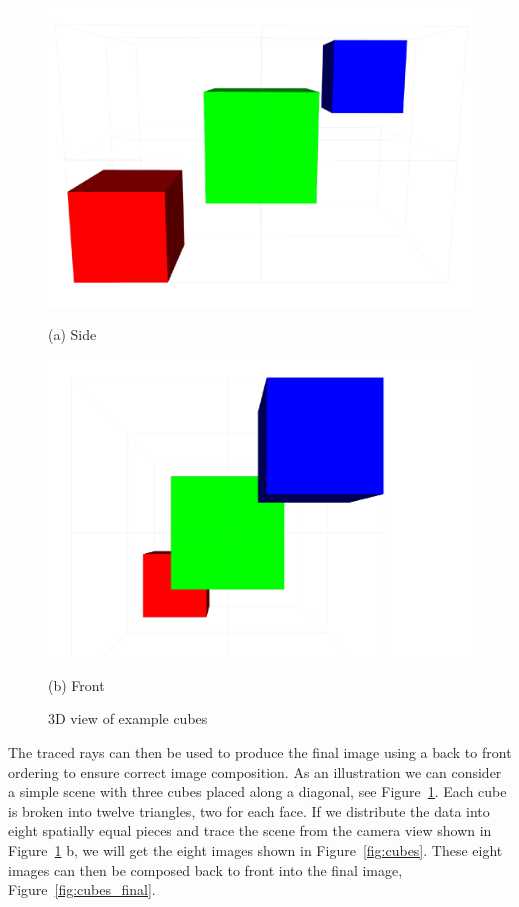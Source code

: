 \begin{figure}[!htb]
  \includegraphics[width=\linewidth]{drawings/side.pdf}
  
(a) Side

\endminipage\hfill
{}
  \includegraphics[width=\linewidth]{drawings/front.pdf}
  
(b) Front

\endminipage\hfill
\caption{3D view of example cubes}
\label{fig:cubes_3d}
\end{figure}

The traced rays can then be used to produce the final image using a back to 
front ordering to ensure correct image composition.  As an illustration we can 
consider a simple scene with three cubes placed along a diagonal, 
see Figure~\ref{fig:cubes_3d}.  Each cube is broken into twelve triangles, two 
for each face.  If we distribute the data into eight spatially equal pieces and 
trace the scene from the camera view shown in Figure~\ref{fig:cubes_3d} b, we 
will get the eight images shown in Figure~\ref{fig:cubes}.  These eight images 
can then be composed back to front into the final image, 
Figure~\ref{fig:cubes_final}.

